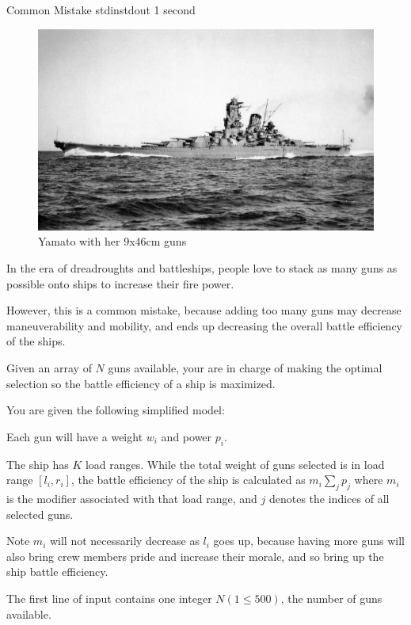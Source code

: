 \begin{problem}{Common Mistake}
{stdin}{stdout}
{1 second}{}{}

\begin{figure}
    \includegraphics[scale=0.3]{yamato.jpg}
    \caption*{Yamato with her 9x46cm guns}
\end{figure}

In the era of dreadroughts and battleships, people love to stack as many guns as
possible onto ships to increase their fire power.

However, this is a common mistake, because adding too many guns may decrease
maneuverability and mobility, and ends up decreasing the overall battle
efficiency of the ships. 

Given an array of $N$ guns available, your are in charge of making the optimal
selection so the battle efficiency of a ship is maximized.

You are given the following simplified model:

Each gun will have a weight $w_i$ and power $p_i$.

The ship has $K$ load ranges. While the total weight of guns selected is in
load range $[l_i, r_i]$, the battle efficiency of the ship is calculated as
$m_i\sum_j p_j$ where $m_i$ is the modifier associated with that load range, and
$j$ denotes the indices of all selected guns.

Note $m_i$ will not necessarily decrease as $l_i$ goes up,
because having more guns will also bring crew members pride and increase their 
morale, and so bring up the ship battle efficiency.

\InputFile

The first line of input contains one integer $N (1 \le 500)$, the number 
of guns available.


\end{problem}
